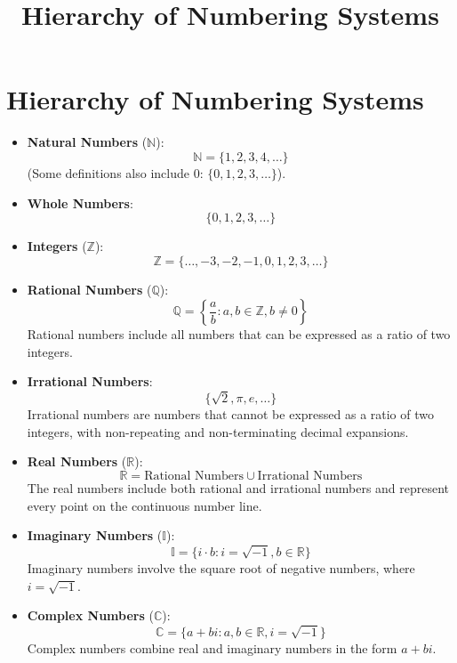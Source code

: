 \documentclass{article}
\begin{document}
\title{Hierarchy of Numbering Systems}
\author{}
\date{}
\maketitle

\section*{Hierarchy of Numbering Systems}

\begin{itemize}
    \item \textbf{Natural Numbers} (\(\mathbb{N}\)): 
    \[
    \mathbb{N} = \{1, 2, 3, 4, \dots \}
    \]
    (Some definitions also include 0: \(\{0, 1, 2, 3, \dots\}\)).
    
    \item \textbf{Whole Numbers}: 
    \[
    \{0, 1, 2, 3, \dots \}
    \]
    
    \item \textbf{Integers} (\(\mathbb{Z}\)): 
    \[
    \mathbb{Z} = \{\dots, -3, -2, -1, 0, 1, 2, 3, \dots \}
    \]
    
    \item \textbf{Rational Numbers} (\(\mathbb{Q}\)): 
    \[
    \mathbb{Q} = \left\{\frac{a}{b} : a, b \in \mathbb{Z}, b \neq 0 \right\}
    \]
    Rational numbers include all numbers that can be expressed as a ratio of two integers.
    
    \item \textbf{Irrational Numbers}: 
    \[
    \{ \sqrt{2}, \pi, e, \dots \}
    \]
    Irrational numbers are numbers that cannot be expressed as a ratio of two integers, with non-repeating and non-terminating decimal expansions.
    
    \item \textbf{Real Numbers} (\(\mathbb{R}\)): 
    \[
    \mathbb{R} = \text{Rational Numbers} \cup \text{Irrational Numbers}
    \]
    The real numbers include both rational and irrational numbers and represent every point on the continuous number line.
    
    \item \textbf{Imaginary Numbers} (\(\mathbb{I}\)): 
    \[
    \mathbb{I} = \{ i \cdot b : i = \sqrt{-1}, b \in \mathbb{R} \}
    \]
    Imaginary numbers involve the square root of negative numbers, where \(i = \sqrt{-1}\).
    
    \item \textbf{Complex Numbers} (\(\mathbb{C}\)): 
    \[
    \mathbb{C} = \{ a + bi : a, b \in \mathbb{R}, i = \sqrt{-1} \}
    \]
    Complex numbers combine real and imaginary numbers in the form \(a + bi\).
    
\end{itemize}
\end{document}
